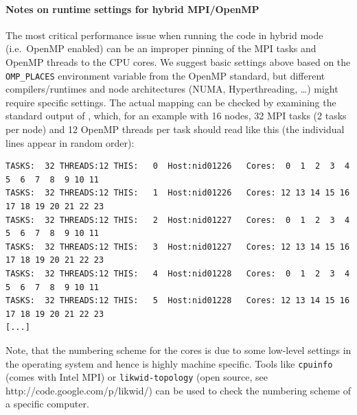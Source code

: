 \documentclass[a4paper, 11pt, DIV=11]{scrartcl}
\begin{document}
\paragraph{Notes on runtime settings for hybrid MPI/OpenMP}

The most critical performance issue when running the code in hybrid mode (i.e.\
OpenMP enabled) can be an improper pinning of the MPI tasks and OpenMP threads to
the CPU cores. We suggest basic settings above based on the \verb+OMP_PLACES+
environment variable from the OpenMP standard, but different
compilers/runtimes and node architectures (NUMA, Hyperthreading,
\dots) might require specific settings. 
The actual mapping can be checked by examining the standard
output of \nsc, which, for an example with 16 nodes, 32 MPI
tasks (2 tasks per node) and 12 OpenMP threads per task should read
like this (the individual lines appear in random order):
\begin{small}
\begin{verbatim}
TASKS:  32 THREADS:12 THIS:   0  Host:nid01226   Cores:  0  1  2  3  4  5  6  7  8  9 10 11
TASKS:  32 THREADS:12 THIS:   1  Host:nid01226   Cores: 12 13 14 15 16 17 18 19 20 21 22 23
TASKS:  32 THREADS:12 THIS:   2  Host:nid01227   Cores:  0  1  2  3  4  5  6  7  8  9 10 11
TASKS:  32 THREADS:12 THIS:   3  Host:nid01227   Cores: 12 13 14 15 16 17 18 19 20 21 22 23
TASKS:  32 THREADS:12 THIS:   4  Host:nid01228   Cores:  0  1  2  3  4  5  6  7  8  9 10 11
TASKS:  32 THREADS:12 THIS:   5  Host:nid01228   Cores: 12 13 14 15 16 17 18 19 20 21 22 23
[...]
\end{verbatim}
\end{small}

Note, that the numbering scheme for the cores is due to some
low-level settings in the operating system and hence is highly machine
specific. Tools like \verb+cpuinfo+ (comes with Intel MPI) or 
\verb+likwid-topology+ (open source, see http://code.google.com/p/likwid/)
can be used to check the numbering scheme of a specific computer.
\end{document}
